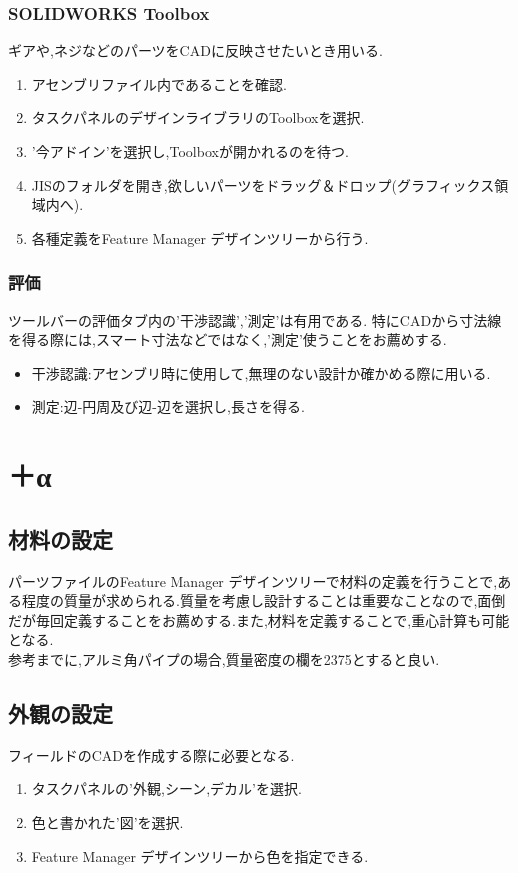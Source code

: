 \documentclass[a4paper,11pt]{jsarticle}
\begin{document}
\subsubsection{SOLIDWORKS Toolbox}
ギアや,ネジなどのパーツをCADに反映させたいとき用いる.
\begin{enumerate}
 \item アセンブリファイル内であることを確認.
 \item タスクパネルのデザインライブラリのToolboxを選択.
 \item '今アドイン'を選択し,Toolboxが開かれるのを待つ.
 \item JISのフォルダを開き,欲しいパーツをドラッグ＆ドロップ(グラフィックス領域内へ).
 \item 各種定義をFeature Manager デザインツリーから行う.
\end{enumerate}
\subsubsection{評価}
ツールバーの評価タブ内の'干渉認識','測定'は有用である.
特にCADから寸法線を得る際には,スマート寸法などではなく,'測定'使うことをお薦めする.
\begin{itemize}
 \item 干渉認識:アセンブリ時に使用して,無理のない設計か確かめる際に用いる.
 \item 測定:辺-円周及び辺-辺を選択し,長さを得る.
\end{itemize}
\section{＋α}
\subsection{材料の設定}
パーツファイルのFeature Manager デザインツリーで材料の定義を行うことで,ある程度の質量が求められる.質量を考慮し設計することは重要なことなので,面倒だが毎回定義することをお薦めする.また,材料を定義することで,重心計算も可能となる.\\
参考までに,アルミ角パイプの場合,質量密度の欄を2375とすると良い.
\subsection{外観の設定}
フィールドのCADを作成する際に必要となる.
\begin{enumerate}
 \item タスクパネルの'外観,シーン,デカル'を選択.
 \item 色と書かれた'図'を選択.
 \item Feature Manager デザインツリーから色を指定できる.
\end{enumerate}
\end{document}
